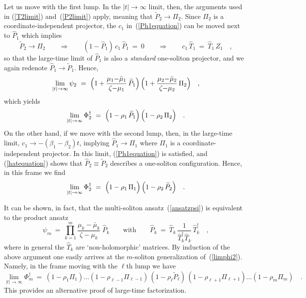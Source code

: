 \documentclass[a4paper,11pt]{article}
\numberwithin{equation}{section}
\def\b{\beta}
\newcommand{\Pt}{\widetilde{P}}
\newcommand{\Th}{\widehat{T}}
\newcommand{\Ph}{\widehat{P}}
\begin{document}
Let us move with the first lump.
In the $|t|\to\infty$ limit, then, the arguments used in (\ref{T2limit})
and~(\ref{P2limit}) apply, meaning that $\Pt_2\to\Pi_2$.
Since $\Pi_2$ is a coordinate-independent projector, 
the $c_1$ in~(\ref{Ph1equation}) can be moved next to $\Ph_1$ which implies
\begin{equation}
\Pt_2\to\Pi_2 \qquad\Longrightarrow\qquad
(1-\Ph_1)\,c_1\,\Ph_1\ =\ 0 \qquad\Longrightarrow\qquad
c_1\,\Th_1\ =\ \Th_1\,Z_1 \quad,
\end{equation}
so that the large-time limit of $\Ph_1$ is also a {\it standard\/} 
one-soliton projector, and we again redenote $\Ph_1\to \Pt_1$. Hence,
\begin{equation}
\lim_{|t|\to\infty} \psi_2\ =\
\Bigl( 1+\frac{\mu_1{-}\bar\mu_1}{\zeta{-}\mu_1}\,\Pt_1 \Bigr)\,
\Bigl( 1+\frac{\mu_2{-}\bar\mu_2}{\zeta{-}\mu_2}\,\Pi_2 \Bigr)\quad,
\end{equation}
which yields
\begin{equation} \label{limphi2}
\lim_{|t|\to\infty} \Phi_2^\dagger\ =\
\Bigl( 1 - \rho_1\,\Pt_1 \Bigr)\,
\Bigl( 1 - \rho_2\,\Pi_2 \Bigr) \quad.
\end{equation}
On the other hand, if we move with the second lump, then, 
in the large-time limit, $c_1\to-(\b_1{-}\b_2)t$, implying
$\Ph_1\to\Pi_1$ where $\Pi_1$ is a coordinate-independent projector.
In this limit, (\ref{Ph1equation}) is satisfied, and (\ref{hatequation})
shows that $\Ph_2{\equiv}\Pt_2$ describes a one-soliton configuration.
Hence, in this frame we find
\begin{equation}
\lim_{|t|\to\infty} \Phi_2^\dagger\ =\
\Bigl( 1 - \rho_1\,\Pi_1 \Bigr)\,
\Bigl( 1 - \rho_2\,\Pt_2 \Bigr) \quad.
\end{equation}

It can be shown, in fact, that the multi-soliton ansatz~(\ref{ansatzpsi})
is equivalent to the product ansatz
\begin{equation}
\psi_m\ =\ \prod_{k=1}^m
\frac{\mu_k-\bar{\mu}_k}{\zeta-\mu_k}\;\Ph_k
\qquad\textrm{with}\qquad
\Ph_k\ =\ \Th_k\,\frac{1}{\Th_k^\dagger\Th_k}\,\Th_k^\dagger \quad,
\end{equation}
where in general the $\Th_k$ are `non-holomorphic' matrices.
By induction of the above argument one easily arrives at the $m$-soliton 
generalization of~(\ref{limphi2}).
Namely, in the frame moving with the $\ell$th lump we have
\begin{equation}
\lim_{|t|\to\infty} \Phi_m^\dagger\ =\
(1-\rho_1\Pi_1)\ldots(1-\rho_{\ell-1}\Pi_{\ell-1})\,
(1-\rho_\ell\Pt_\ell)\,(1-\rho_{\ell+1}\Pi_{\ell+1})\ldots(1-\rho_m\Pi_m) \quad.
\end{equation}
This provides an alternative proof of large-time factorization.
\end{document}
